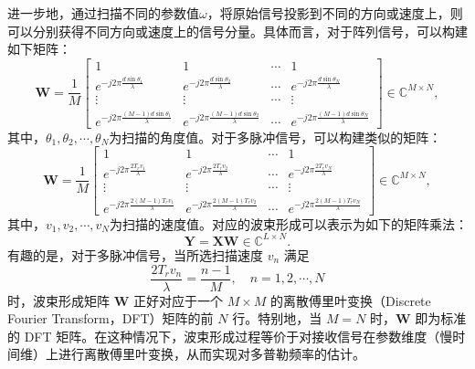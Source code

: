 进一步地，通过扫描不同的参数值\( \omega \)，将原始信号投影到不同的方向或速度上，则可以分别获得不同方向或速度上的信号分量。具体而言，对于阵列信号，可以构建如下矩阵：
\[
    \mathbf{W} = \frac{1}{M}\begin{bmatrix}
        1                                                   & 1                                                    & \cdots & 1                                                   \\
        e^{- j 2 \pi \frac{d \sin \theta_1}{\lambda}}       & e^{- j 2 \pi \frac{d \sin \theta_2}{\lambda}}        & \cdots & e^{- j 2 \pi \frac{d \sin \theta_N}{\lambda}}       \\
        \vdots                                              & \vdots                                               & \cdots & \vdots                                              \\
        e^{- j 2 \pi \frac{(M-1) d \sin \theta_1}{\lambda}} & e^{- j 2 \pi \frac{ (M-1) d \sin \theta_2}{\lambda}} & \cdots & e^{- j 2 \pi \frac{(M-1) d \sin \theta_N}{\lambda}}
    \end{bmatrix}\in \mathbb{C}^{M \times N},
\]
其中，\( \theta_1, \theta_2, \cdots, \theta_N \)为扫描的角度值。对于多脉冲信号，可以构建类似的矩阵：
\[
    \mathbf{W} = \frac{1}{M}\begin{bmatrix}
        1                                             & 1                                             & \cdots & 1                                             \\
        e^{- j 2 \pi \frac{2 T_r v_1}{\lambda}}       & e^{- j 2 \pi \frac{2 T_r v_2}{\lambda}}       & \cdots & e^{- j 2 \pi \frac{2 T_r v_N}{\lambda}}       \\
        \vdots                                        & \vdots                                        & \cdots & \vdots                                        \\
        e^{- j 2 \pi \frac{2 (M-1) T_r v_1}{\lambda}} & e^{- j 2 \pi \frac{2 (M-1) T_r v_2}{\lambda}} & \cdots & e^{- j 2 \pi \frac{2 (M-1) T_r v_N}{\lambda}}
    \end{bmatrix} \in \mathbb{C}^{M \times N},
\]
其中，\( v_1, v_2, \cdots, v_N \)为扫描的速度值。对应的波束形成可以表示为如下的矩阵乘法：
\[
    \mathbf{Y} = \mathbf{X} \mathbf{W} \in \mathbb{C}^{L \times N}.
\]
有趣的是，对于多脉冲信号，当所选扫描速度 $v_n$ 满足
\[
    \frac{2 T_r v_n}{\lambda} = \frac{n-1}{M}, \quad n = 1, 2, \cdots, N
\]
时，波束形成矩阵 $\mathbf{W}$ 正好对应于一个 $M \times M$ 的离散傅里叶变换（Discrete Fourier Transform，DFT）矩阵的前 $N$ 行。特别地，当 $M = N$ 时，$\mathbf{W}$ 即为标准的 DFT 矩阵。在这种情况下，波束形成过程等价于对接收信号在参数维度（慢时间维）上进行离散傅里叶变换，从而实现对多普勒频率的估计。

